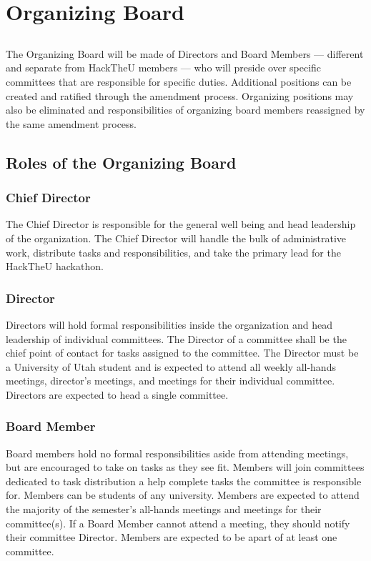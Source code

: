 \documentclass[12pt]{article}
\begin{document}
\section{Organizing Board}

\subsection{} The Organizing Board will be made of Directors and Board Members --- different and separate from HackTheU members --- who will preside over specific committees that are 
responsible for specific duties. Additional positions can be created and ratified through
the amendment process. Organizing positions may also be eliminated and responsibilities
of organizing board members reassigned by the same amendment process.

\subsection{Roles of the Organizing Board}
\subsubsection{Chief Director}
\noindent The Chief Director is responsible for the general well being and head leadership 
of the organization. 
The Chief Director will handle the bulk of administrative work, 
distribute tasks and responsibilities,
and take the primary lead for the HackTheU hackathon.

\subsubsection{Director}
\noindent Directors will hold formal responsibilities inside the organization and 
head leadership of individual committees. The Director of a committee shall be the chief
point of contact for tasks assigned to the committee. The Director must be a University
of Utah student and is expected to attend all weekly all-hands meetings, director's meetings,
and meetings for their individual committee.
Directors are expected to head a single committee.

\subsubsection{Board Member}
\noindent Board members hold no formal responsibilities aside from attending meetings,
but are encouraged to take on tasks as they see fit. Members will join committees
dedicated to task distribution a help complete tasks the committee is responsible for.
Members can be students of any university. Members are expected to attend 
the majority of the semester's all-hands meetings
and meetings for their committee(s). If a Board Member cannot attend a meeting, they
should notify their committee Director. Members are expected to be apart of at least
one committee.
\end{document}
